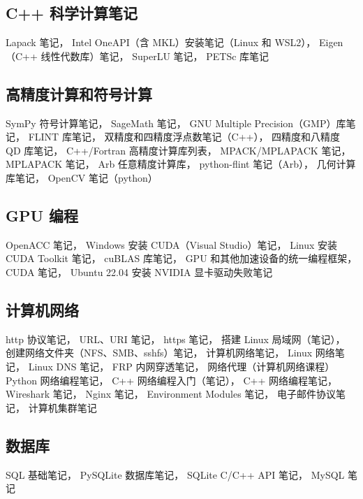 \subsection{C++ 科学计算笔记}
Lapack 笔记，
Intel OneAPI（含 MKL）安装笔记（Linux 和 WSL2），
Eigen （C++ 线性代数库）笔记，
SuperLU 笔记，
PETSc 库笔记

\subsection{高精度计算和符号计算}
SymPy 符号计算笔记，
SageMath 笔记，
GNU Multiple Precision（GMP）库笔记，
FLINT 库笔记，
双精度和四精度浮点数笔记（C++），
四精度和八精度 QD 库笔记，
C++/Fortran 高精度计算库列表，
MPACK/MPLAPACK 笔记，
MPLAPACK 笔记，
Arb 任意精度计算库，
python-flint 笔记（Arb），
几何计算库笔记，
OpenCV 笔记（python）

\subsection{GPU 编程}
OpenACC 笔记，
Windows 安装 CUDA（Visual Studio）笔记，
Linux 安装 CUDA Toolkit 笔记，
cuBLAS 库笔记，
GPU 和其他加速设备的统一编程框架，
CUDA 笔记，
Ubuntu 22.04 安装 NVIDIA 显卡驱动失败笔记

\subsection{计算机网络}
http 协议笔记，
URL、URI 笔记，
https 笔记，
搭建 Linux 局域网（笔记），
创建网络文件夹（NFS、SMB、sshfs）笔记，
计算机网络笔记，
Linux 网络笔记，
Linux DNS 笔记，
FRP 内网穿透笔记，
网络代理（计算机网络课程）
Python 网络编程笔记，
C++ 网络编程入门（笔记），
C++ 网络编程笔记，
Wireshark 笔记，
Nginx 笔记，
Environment Modules 笔记，
电子邮件协议笔记，
计算机集群笔记

\subsection{数据库}
SQL 基础笔记，
PySQLite 数据库笔记，
SQLite C/C++ API 笔记，
MySQL 笔记


